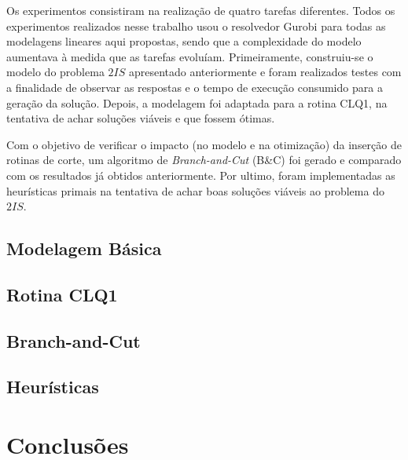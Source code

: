 \documentclass[12pt]{article}
\begin{document}
Os experimentos consistiram na realização de quatro tarefas diferentes. Todos os experimentos realizados nesse trabalho usou o resolvedor Gurobi para todas as modelagens lineares aqui propostas, sendo que a complexidade do modelo aumentava à medida que as tarefas evoluíam. 
Primeiramente, construiu-se o modelo do problema $2IS$ apresentado anteriormente e foram realizados testes com a finalidade de observar as respostas e o tempo de execução consumido para a geração da solução. Depois, a modelagem foi adaptada para a rotina CLQ1, na tentativa de achar soluções viáveis e que fossem ótimas.

Com o objetivo de verificar o impacto (no modelo e na otimização) da inserção de rotinas de corte, um algoritmo de \textit{Branch-and-Cut} (B\&C) foi gerado e comparado com os resultados já obtidos anteriormente. 
Por ultimo, foram implementadas as heurísticas primais na tentativa de achar boas soluções viáveis ao problema do $2IS$.

\subsection{Modelagem Básica}
\subsection{Rotina CLQ1}
\subsection{Branch-and-Cut}
\subsection{Heurísticas}

\section{Conclusões}
\end{document}
